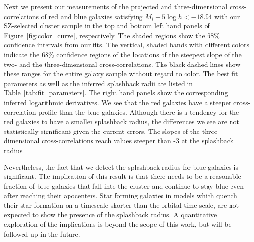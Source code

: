 \documentclass[iop, apjl, twocolappendix, numberedappendix]{emulateapj}
\begin{document}

Next we present our measurements of the projected and
three-dimensional cross-correlations of red and blue galaxies
satisfying $M_{i}-5\log h<-18.94$ with our SZ-selected cluster
sample in the top and bottom left hand panels of
Figure~\ref{fig:color_curve}, respectively. The shaded regions show
the 68\% confidence intervals from our fits. The vertical, shaded
bands with different colors indicate the 68\% confidence regions of
the locations of the steepest slope of the two- and the
three-dimensional cross-correlations. The black dashed lines show
these ranges for the entire galaxy sample without regard to color.
The best fit parameters as well as the inferred splashback radii are
listed in Table~\ref{tab:fit_parameters}. The right hand
panels show the corresponding inferred logarithmic derivatives. We
see that the red galaxies have a steeper cross-correlation profile
than the blue galaxies. Although there is a tendency for the red
galaxies to have a smaller splashback radius, the differences we see
are not statistically significant given the current errors. The
slopes of the three-dimensional cross-correlations reach values
steeper than -3 at the splashback radius.

Nevertheless, the fact that we detect the splashback radius for blue
galaxies is significant. The implication of this result is that
there needs to be a reasonable fraction of blue galaxies that fall
into the cluster and continue to stay blue even after reaching their
apocenters. Star forming galaxies in models which quench their star
formation on a timescale shorter than the orbital time scale, are
not expected to show the presence of the splashback radius. A
quantitative exploration of the implications is beyond the scope of
this work, but will be followed up in the future.
\end{document}
